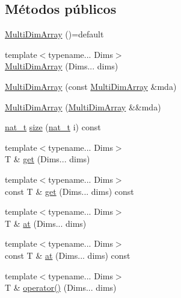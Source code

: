 \subsection*{Métodos públicos}
\begin{DoxyCompactItemize}
\item 
\hyperlink{class_designar_1_1_multi_dim_array_a52a96f1eeb1176cc18d6329ab75e59f8}{Multi\+Dim\+Array} ()=default
\item 
{\footnotesize template$<$typename... Dims$>$ }\\\hyperlink{class_designar_1_1_multi_dim_array_a87e9b411cccc10d39117d1ccdcd66261}{Multi\+Dim\+Array} (Dims... dims)
\item 
\hyperlink{class_designar_1_1_multi_dim_array_a4dd6166b45028efc4bab7cd42c492663}{Multi\+Dim\+Array} (const \hyperlink{class_designar_1_1_multi_dim_array}{Multi\+Dim\+Array} \&mda)
\item 
\hyperlink{class_designar_1_1_multi_dim_array_aaa91d894b0e4065cba28a9066c0513b8}{Multi\+Dim\+Array} (\hyperlink{class_designar_1_1_multi_dim_array}{Multi\+Dim\+Array} \&\&mda)
\item 
\hyperlink{namespace_designar_aa72662848b9f4815e7bf31a7cf3e33d1}{nat\+\_\+t} \hyperlink{class_designar_1_1_multi_dim_array_a39d5dcd40ce04bf3113c0f6d83805d0a}{size} (\hyperlink{namespace_designar_aa72662848b9f4815e7bf31a7cf3e33d1}{nat\+\_\+t} i) const
\item 
{\footnotesize template$<$typename... Dims$>$ }\\T \& \hyperlink{class_designar_1_1_multi_dim_array_a27a85daef556fb6cdb3f0c0b0d16e4d0}{get} (Dims... dims)
\item 
{\footnotesize template$<$typename... Dims$>$ }\\const T \& \hyperlink{class_designar_1_1_multi_dim_array_a36ba716b359942501b9cd6d96562e774}{get} (Dims... dims) const
\item 
{\footnotesize template$<$typename... Dims$>$ }\\T \& \hyperlink{class_designar_1_1_multi_dim_array_a35f5b6b915a03e4ba04ccd28af40dc79}{at} (Dims... dims)
\item 
{\footnotesize template$<$typename... Dims$>$ }\\const T \& \hyperlink{class_designar_1_1_multi_dim_array_aa6c5641e0839fae2bc8d1dadc134cc71}{at} (Dims... dims) const
\item 
{\footnotesize template$<$typename... Dims$>$ }\\T \& \hyperlink{class_designar_1_1_multi_dim_array_a9547e76013b4f532de026ec425ad4f7a}{operator()} (Dims... dims)

\end{DoxyCompactItemize}
